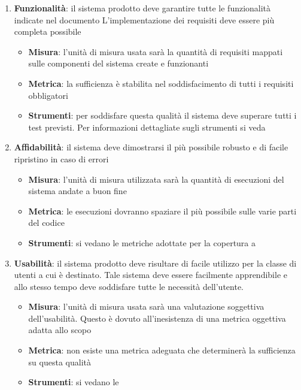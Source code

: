 {  \begin{enumerate}
  \item \textbf{Funzionalità}: il sistema prodotto deve garantire tutte
    le funzionalità indicate nel documento \emph{\analisideirequisiti} L'implementazione dei requisiti deve essere più completa
    possibile

    \begin{itemize}
    \item \textbf{Misura}: l’unità di misura usata sarà la quantità di requisiti mappati sulle componenti del sistema create e funzionanti
    \item \textbf{Metrica}: la sufficienza è stabilita nel soddisfacimento di tutti i requisiti obbligatori
    \item \textbf{Strumenti}: per soddisfare questa qualità il sistema deve superare tutti i test previsti.
      Per informazioni dettagliate sugli strumenti si veda  \emph{\normediprogetto}
    \end{itemize}

  \item \textbf{Affidabilità}: il sistema deve dimostrarsi il più possibile robusto e di facile ripristino in caso di errori

    \begin{itemize}
    \item \textbf{Misura}: l’unità di misura utilizzata sarà la quantità di esecuzioni del sistema andate a buon fine
    \item \textbf{Metrica}: le esecuzioni dovranno spaziare il più
      possibile sulle varie parti del codice
    \item \textbf{Strumenti}: si vedano le metriche adottate per la
      copertura a %
    \end{itemize}

  \item \textbf{Usabilità}: il sistema prodotto deve risultare di facile
    utilizzo per la classe di utenti a cui è destinato. Tale sistema
    deve essere facilmente apprendibile e allo stesso tempo deve
    soddisfare tutte le necessità dell’utente.
    \begin{itemize}
    \item \textbf{Misura}: l’unità di misura usata sarà una valutazione soggettiva dell’usabilità. Questo è dovuto all’inesistenza di una metrica oggettiva adatta allo scopo
    \item \textbf{Metrica}:  non esiste una metrica adeguata che determinerà la sufficienza su questa qualità
    \item \textbf{Strumenti}: si vedano le  \emph{\normediprogetto}
    \end{itemize}


\end{enumerate}}
